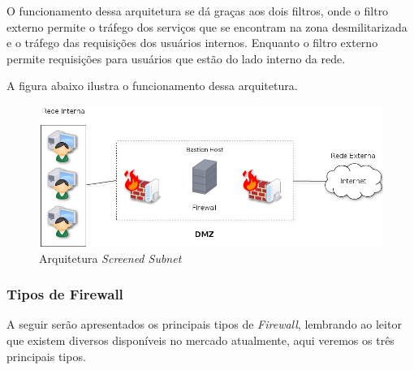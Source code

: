 \begin{itemize}
O funcionamento dessa arquitetura se dá graças aos dois filtros, onde o filtro externo permite o tráfego dos serviços que se encontram na zona desmilitarizada e o tráfego das requisições dos usuários internos. Enquanto o filtro externo permite requisições para usuários que estão do lado interno da rede.

A figura abaixo ilustra o funcionamento dessa arquitetura.

\begin{figure}[!h]
\centering
\includegraphics[width = 15cm]{ScreenedSubnet.png}
\caption{Arquitetura \textit{Screened Subnet}} 	
\end{figure}

\end{itemize}

\subsubsection{Tipos de Firewall}
A seguir serão apresentados os principais tipos de \textit{Firewall}, lembrando ao leitor que existem diversos disponíveis no mercado atualmente, aqui veremos os três principais tipos.

